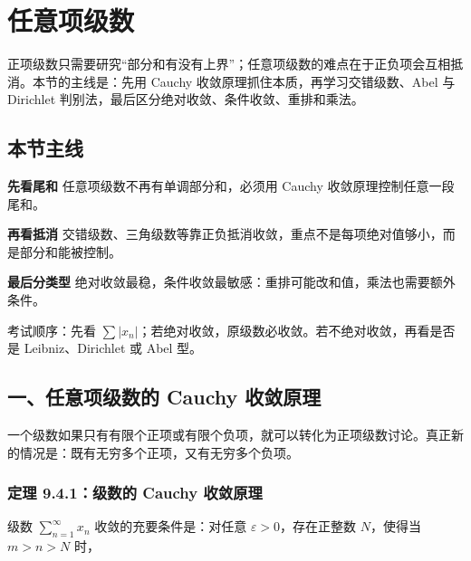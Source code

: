 \section{任意项级数}

正项级数只需要研究“部分和有没有上界”；任意项级数的难点在于正负项会互相抵消。本节的主线是：先用 Cauchy 收敛原理抓住本质，再学习交错级数、Abel 与 Dirichlet 判别法，最后区分绝对收敛、条件收敛、重排和乘法。

\subsection*{本节主线}

\begin{conceptbox}
\textbf{先看尾和}
任意项级数不再有单调部分和，必须用 Cauchy 收敛原理控制任意一段尾和。
\end{conceptbox}

\begin{conceptbox}
\textbf{再看抵消}
交错级数、三角级数等靠正负抵消收敛，重点不是每项绝对值够小，而是部分和能被控制。
\end{conceptbox}

\begin{conceptbox}
\textbf{最后分类型}
绝对收敛最稳，条件收敛最敏感：重排可能改和值，乘法也需要额外条件。
\end{conceptbox}

\begin{notebox}
考试顺序：先看 \(\sum |x_n|\)；若绝对收敛，原级数必收敛。若不绝对收敛，再看是否是 Leibniz、Dirichlet 或 Abel 型。
\end{notebox}

\subsection*{一、任意项级数的 Cauchy 收敛原理}

一个级数如果只有有限个正项或有限个负项，就可以转化为正项级数讨论。真正新的情况是：既有无穷多个正项，又有无穷多个负项。

\subsubsection*{定理 9.4.1：级数的 Cauchy 收敛原理}

级数 \(\sum_{n=1}^{\infty}x_n\) 收敛的充要条件是：对任意 \(\varepsilon>0\)，存在正整数 \(N\)，使得当 \(m>n>N\) 时，

